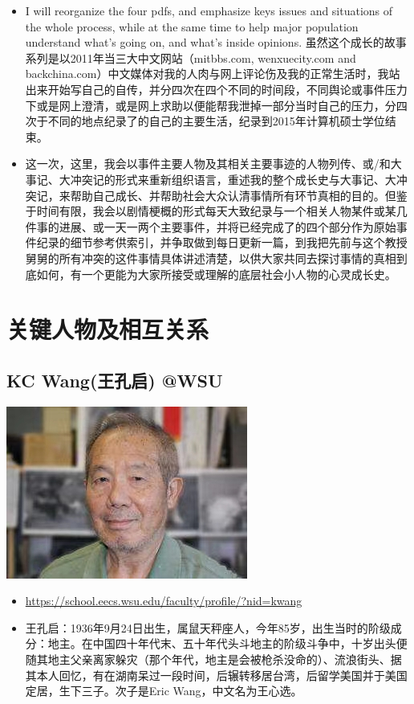 \documentclass[9pt, b5paper]{article}
\begin{document}
\begin{itemize}
\item I will reorganize the four pdfs, and emphasize keys issues and situations of the whole process, while at the same time to help major population understand what's going on, and what's inside opinions. 虽然这个成长的故事系列是以2011年当三大中文网站（mitbbs.com, wenxuecity.com and backchina.com）中文媒体对我的人肉与网上评论伤及我的正常生活时，我站出来开始写自己的自传，并分四次在四个不同的时间段，不同舆论或事件压力下或是网上澄清，或是网上求助以便能帮我泄掉一部分当时自己的压力，分四次于不同的地点纪录了的自己的主要生活，纪录到2015年计算机硕士学位结束。
\item 这一次，这里，我会以事件主要人物及其相关主要事迹的人物列传、或/和大事记、大冲突记的形式来重新组织语言，重述我的整个成长史与大事记、大冲突记，来帮助自己成长、并帮助社会大众认清事情所有环节真相的目的。但鉴于时间有限，我会以剧情梗概的形式每天大致纪录与一个相关人物某件或某几件事的进展、或一天一两个主要事件，并将已经完成了的四个部分作为原始事件纪录的细节参考供索引，并争取做到每日更新一篇，到我把先前与这个教授舅舅的所有冲突的这件事情具体讲述清楚，以供大家共同去探讨事情的真相到底如何，有一个更能为大家所接受或理解的底层社会小人物的心灵成长史。
\end{itemize}


\section{关键人物及相互关系}
\label{sec-3}
\subsection{KC Wang(王孔启) @WSU}
\label{sec-3-1}

\includegraphics[width=.9\linewidth]{./pic/KCWang.jpg}
\begin{itemize}
\item \url{https://school.eecs.wsu.edu/faculty/profile/?nid=kwang}
\item 王孔启：1936年9月24日出生，属鼠天秤座人，今年85岁，出生当时的阶级成分：地主。在中国四十年代末、五十年代头斗地主的阶级斗争中，十岁出头便随其地主父亲离家躲灾（那个年代，地主是会被枪杀没命的）、流浪街头、据其本人回忆，有在湖南呆过一段时间，后辗转移居台湾，后留学美国并于美国定居，生下三子。次子是Eric Wang，中文名为王心选。
\end{itemize}
\end{document}
